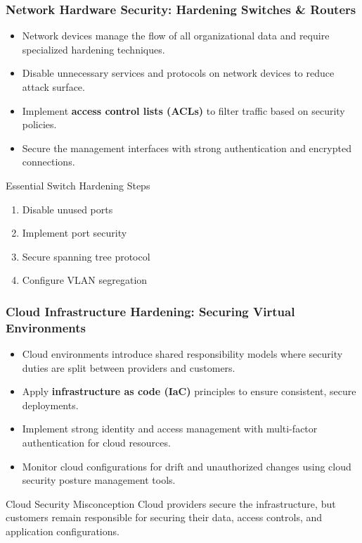 \documentclass{beamer}
\begin{document}
\begin{frame}
    \frametitle{Network Hardware Security: Hardening Switches \& Routers}
    
    \begin{itemize}
        \item Network devices manage the flow of all organizational data and require specialized hardening techniques.
        \item Disable unnecessary services and protocols on network devices to reduce attack surface.
        \item Implement \textbf{access control lists (ACLs)} to filter traffic based on security policies.
        \item Secure the management interfaces with strong authentication and encrypted connections.
    \end{itemize}
    
    \begin{block}{Essential Switch Hardening Steps}
        \begin{enumerate}
            \item Disable unused ports
            \item Implement port security
            \item Secure spanning tree protocol
            \item Configure VLAN segregation
        \end{enumerate}
    \end{block}
\end{frame}

\begin{frame}
    \frametitle{Cloud Infrastructure Hardening: Securing Virtual Environments}
    
    \begin{itemize}
        \item Cloud environments introduce shared responsibility models where security duties are split between providers and customers.
        \item Apply \textbf{infrastructure as code (IaC)} principles to ensure consistent, secure deployments.
        \item Implement strong identity and access management with multi-factor authentication for cloud resources.
        \item Monitor cloud configurations for drift and unauthorized changes using cloud security posture management tools.
    \end{itemize}
    
    \begin{alertblock}{Cloud Security Misconception}
        Cloud providers secure the infrastructure, but customers remain responsible for securing their data, access controls, and application configurations.
    \end{alertblock}
\end{frame}
\end{document}
